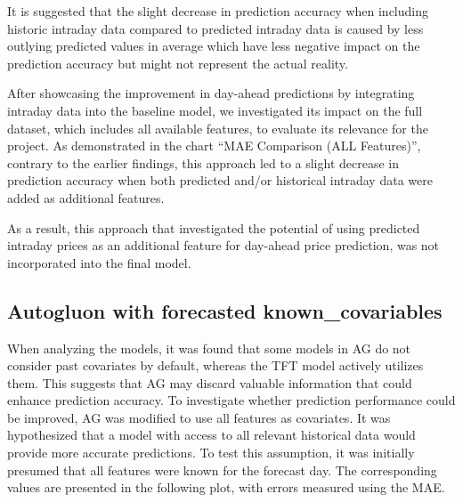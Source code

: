 \documentclass[a4paper]{article}
\begin{document}
It is suggested that the slight decrease in prediction accuracy when
including historic intraday data compared to predicted intraday data is
caused by less outlying predicted values in average which have less
negative impact on the prediction accuracy but might not represent the
actual reality.

After showcasing the improvement in day-ahead predictions by integrating
intraday data into the baseline model, we investigated its impact on the
full dataset, which includes all available features, to evaluate its
relevance for the project. As demonstrated in the chart ``MAE Comparison
(ALL Features)'', contrary to the earlier findings, this approach led to
a slight decrease in prediction accuracy when both predicted and/or
historical intraday data were added as additional features.

As a result, this approach that investigated the potential of using
predicted intraday prices as an additional feature for day-ahead price
prediction, was not incorporated into the final model.

    \subsection{Autogluon with forecasted
known\_covariables}\label{autogluon-with-forecasted-known_covariables}

When analyzing the models, it was found that some models in AG do not
consider past covariates by default, whereas the TFT model actively
utilizes them. This suggests that AG may discard valuable information
that could enhance prediction accuracy. To investigate whether
prediction performance could be improved, AG was modified to use all
features as covariates. It was hypothesized that a model with access to
all relevant historical data would provide more accurate predictions. To
test this assumption, it was initially presumed that all features were
known for the forecast day. The corresponding values are presented in
the following plot, with errors measured using the MAE.
\end{document}
